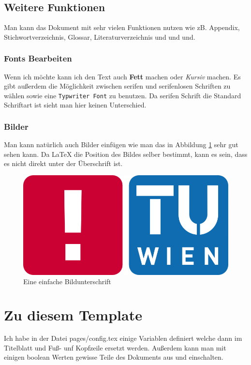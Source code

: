 \subsection{Weitere Funktionen}
Man kann das Dokument mit sehr vielen Funktionen nutzen wie zB. Appendix, Stichwortverzeichnis, Glossar, Literaturverzeichnis und und und.

\subsubsection{Fonts Bearbeiten}
\label{sec:Fonts Bearbeiten}
Wenn ich möchte kann ich den Text auch \textbf{Fett} machen oder \textit{Kursiv} machen. Es gibt außerdem die Möglichkeit zwischen \textrm{serifen} und \textsf{serifenlosen} Schriften zu wählen sowie eine \texttt{Typwriter Font} zu benutzen. Da serifen Schrift die Standard Schriftart ist sieht man hier keinen Unterschied.
\subsubsection{Bilder}
Man kann natürlich auch Bilder einfügen wie man das in Abbildung \ref{fig:TUWien Logo} sehr gut sehen kann. Da \LaTeX \; die Position des Bildes selber bestimmt, kann es sein, dass es nicht direkt unter der Überschrift ist.

\begin{figure}
	\centering
	\includegraphics[scale=0.3]{img/logo_tuwien_with_informatics.png}
	\caption{Eine einfache Bildunterschrift}
	\label{fig:TUWien Logo}
\end{figure}

\section{Zu diesem Template}
Ich habe in der Datei pages/config.tex einige Variablen definiert welche dann im Titelblatt und Fuß- unf Kopfzeile ersetzt werden. Außerdem kann man mit einigen boolean Werten gewisse Teile des Dokuments aus und einschalten.



